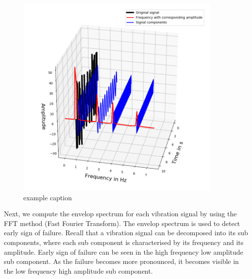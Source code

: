\documentclass[11pt, oneside]{article}   	%
\begin{document}
\begin{flushleft}
\begin{figure}[H] %
   \centering
   \includegraphics[width=4in]{decomposition} 
   \caption{example caption}
   \label{fig:example}
\end{figure}



Next, we compute the envelop spectrum for each vibration signal by using the FFT method (Fast Fourier Transform). The envelop spectrum is used to detect early sign of failure. Recall that a vibration signal can be decomposed into its sub components, where each  sub component 
is characterised by its frequency and its amplitude. Early sign of failure can be seen in the high frequency low amplitude sub component. As the failure becomes more pronounced, it becomes visible in the low frequency high amplitude sub component.
\end{flushleft}
\end{document}
